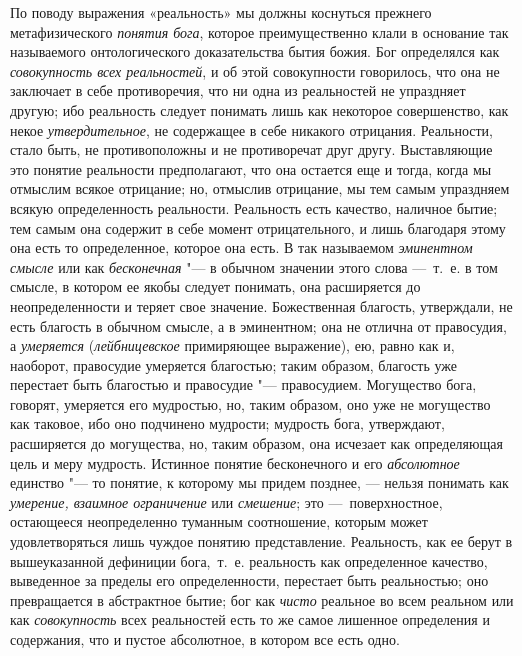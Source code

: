 По поводу выражения «реальность» мы должны коснуться прежнего
метафизического {\em понятия бога}, которое
преимущественно клали в основание так называемого онтологического
доказательства бытия божия. Бог определялся как
{\em совокупность всех реальностей}, и об этой
совокупности говорилось, что она не заключает в себе противоречия, что ни
одна из реальностей не упраздняет другую; ибо реальность следует понимать
лишь как некоторое совершенство, как некое
{\em утвердительное}, не содержащее в себе никакого
отрицания. Реальности, стало быть, не противоположны и не противоречат друг
другу.
\label{bkm:bm73b}
Выставляющие это понятие реальности предполагают, что она остается еще и
тогда, когда мы отмыслим всякое отрицание; но, отмыслив отрицание, мы тем
самым упраздняем всякую определенность реальности. Реальность есть
качество, наличное бытие; тем самым она содержит в себе момент
отрицательного, и лишь благодаря этому она есть то определенное, которое
она есть. В так называемом
{\em эминентном}
{\em смысле} или как
{\em бесконечная} "--- в обычном значении этого слова
—~т.~е. в том смысле, в котором ее якобы следует понимать, она расширяется
до неопределенности и теряет свое значение. Божественная благость,
утверждали, не есть благость в обычном смысле, а в эминентном; она не
отлична от правосудия, а {\em умеряется}
({\em лейбницевское} примиряющее выражение), ею, равно
как и, наоборот, правосудие умеряется благостью; таким образом, благость
уже перестает быть благостью и правосудие "--- правосудием. Могущество бога,
говорят, умеряется его мудростью, но, таким образом, оно уже не могущество
как таковое, ибо оно подчинено мудрости; мудрость бога, утверждают,
расширяется до могущества, но, таким образом, она исчезает как определяющая
цель и меру мудрость. Истинное понятие бесконечного и его
{\em абсолютное} единство "--- то понятие, к которому мы
придем позднее, — нельзя понимать как {\em умерение,
взаимное ограничение} или {\em смешение}; это
—~поверхностное, остающееся неопределенно туманным соотношение, которым
может удовлетворяться лишь чуждое понятию представление. Реальность, как ее
берут в вышеуказанной дефиниции бога,~т.~е. реальность как определенное
качество, выведенное за пределы его определенности, перестает быть
реальностью; оно превращается в абстрактное бытие; бог как
{\em чисто} реальное во всем реальном или как
{\em совокупность} всех реальностей есть то же самое
лишенное определения и содержания, что и пустое абсолютное, в котором все
есть одно.

